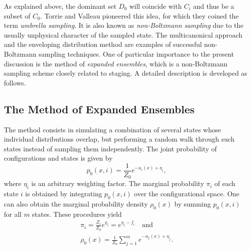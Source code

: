 \documentclass[aip,jcp,reprint,amsmath,amssymb]{revtex4-1}
\begin{document}
As explained above, the dominant set $D_0$ will coincide with $C_i$ and thus be a subset of $C_0$. Torrie and Valleau\cite{Torrie_1977} pioneered this idea, for which they coined the term \textit{umbrella sampling}. It is also known as \textit{non-Boltzmann sampling} due to the usually unphysical character of the sampled state. The multicanonical approach\cite{Berg_1992, Lee_1993, Abreu_2006} and the enveloping distribution method\cite{Christ_2007, *Christ_2008, *Christ_2009} are examples of successful non-Boltzmann sampling techniques. One of particular importance to the present discussion is the method of \textit{expanded ensembles},\cite{Lyubartsev_1992} which is a non-Boltzmann sampling scheme closely related to staging. A detailed description is developed as follows.

\subsection{The Method of Expanded Ensembles}

The method consists in simulating a combination of several states whose individual distributions overlap, but performing a random walk through such states instead of sampling them independently. The joint probability of configurations and states is given by\cite{Nymeyer_2010}
\begin{equation}
\label{eq:expanded ensemble joint}
p_0(x, i) = \frac{1}{Z_0} e^{-u_i(x) + \eta_i},
\end{equation}
where $\eta_i$ is an arbitrary weighting factor. The marginal probability $\pi_i$ of each state $i$ is obtained by integrating $p_0(x,i)$ over the configurational space. One can also obtain the marginal probability density $\rho_0(x)$ by summing $p_0(x,i)$ for all $m$ states. These procedures yield
\begin{align}
\pi_i = \frac{Z_i}{Z_0} e^{\eta_i} = e^{\eta_i - f_i} \quad \text{and} \label{eq:expanded ensemble prior} \\
\rho_0(x) = \frac{1}{Z_0} \sum_{j=1}^m e^{-u_j(x) + \eta_j}. \label{eq:expanded ensemble evidence}
\end{align}
\end{document}
